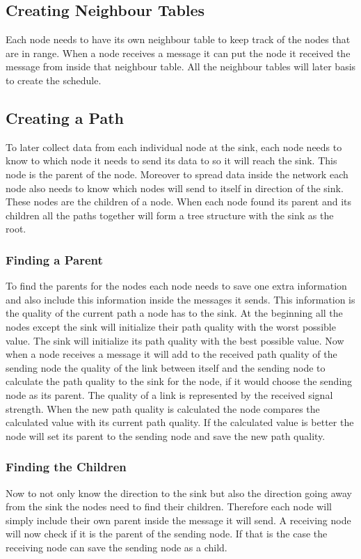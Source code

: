 \subsection{Creating Neighbour Tables}
Each node needs to have its own neighbour table to keep track of the nodes that are in range. When a node receives a message it can put the node it received the message from inside that neighbour table. All the neighbour tables will later basis to create the schedule.
\subsection{Creating a Path}
To later collect data from each individual node at the sink, each node needs to know to which node it needs to send its data to so it will reach the sink. This node is the parent of the node. Moreover to spread data inside the network each node also needs to know which nodes will send to itself in direction of the sink. These nodes are the children of a node. When each node found its parent and its children all the paths together will form a tree structure with the sink as the root.
\subsubsection{Finding a Parent}
To find the parents for the nodes each node needs to save one extra information and also include this information inside the messages it sends. This information is the quality of the current path a node has to the sink. At the beginning all the nodes except the sink will initialize their path quality with the worst possible value. The sink will initialize its path quality with the best possible value. Now when a node receives a message it will add to the received path quality of the sending node the quality of the link between itself and the sending node to calculate the path quality to the sink for the node, if it would choose the sending node as its parent. The quality of a link is represented by the received signal strength. When the new path quality is calculated the node compares the calculated value with its current path quality. If the calculated value is better the node will set its parent to the sending node and save the new path quality. 
\subsubsection{Finding the Children} 
Now to not only know the direction to the sink but also the direction going away from the sink the nodes need to find their children. Therefore each node will simply include their own parent inside the message it will send. A receiving node will now check if it is the parent of the sending node. If that is the case the receiving node can save the sending node as a child.       

